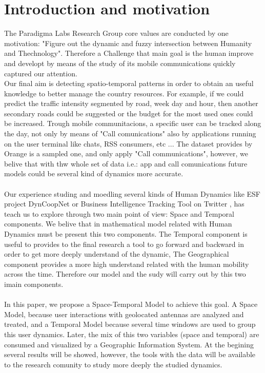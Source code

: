 \newpage
\setcounter{secnumdepth}{1}
\section{Introduction and motivation}
The Paradigma Labs Research Group core values are conducted by one motivation: "Figure out the dynamic and fuzzy intersection between Humanity and Thechnology".  Therefore a Challenge that main goal is the human improve and developt by means of the study of its mobile communications quickly captured our attention.
\\
Our final aim is detecting spatio-temporal patterns in order to obtain an useful knowledge to better manage the country resources. For example, if we could predict the traffic intensity segmented by road, week day and hour, then another secondary roads could be suggested or the budget for the most used ones could be increased. Trough mobile communitacions, a specific user can be tracked along the day, not only by means of "Call comunications" also by applications running on the user terminal like chats, RSS consumers, etc ... The dataset provides by Orange is a sampled one, and only apply "Call communications", however, we belive that with thw whole set of data i.e.: app and call comunications future models could be several kind of dynamics more accurate.
\\
\\
Our experience studing and moedling several kinds of Human Dynamics like ESF project DynCoopNet\citep{dyncoopnet2012} or Business Intelligence Tracking Tool on Twitter \citep{labselecciones}, has teach us to explore through two main point of view: Space and Temporal components. We belive that in mathematical model related with Human Dynamics must be present this two components. The Temporal component is useful to provides to the final research a tool to go forward and backward in order to get more deeply understand of the dynamic, The Geographical component provides a more high understand related with the human mobility across the time. Therefore our model and the sudy will carry out by this two imain components.
\\
\\
In this paper, we propose a Space-Temporal Model to achieve this goal. A Space Model, because user interactions with geolocated antennas are analyzed and treated, and a Temporal Model because several time windows are used to group this user dynamics. Later, the mix of this two variables (space and temporal) are consumed and visualized by a Geographic Information System. At the begining several results will be showed, however, the tools with the data will be available to the research comunity to study more deeply the studied dynamics.

